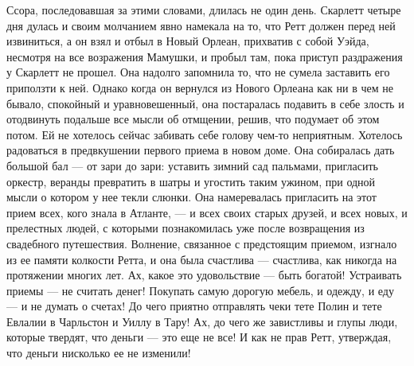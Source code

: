 Ссора, последовавшая за этими словами, длилась не один день. Скарлетт четыре дня дулась и своим молчанием явно намекала на то, что Ретт должен перед ней извиниться, а он взял и отбыл в Новый Орлеан, прихватив с собой Уэйда, несмотря на все возражения Мамушки, и пробыл там, пока приступ раздражения у Скарлетт не прошел. Она надолго запомнила то, что не сумела заставить его приползти к ней.
Однако когда он вернулся из Нового Орлеана как ни в чем не бывало, спокойный и уравновешенный, она постаралась подавить в себе злость и отодвинуть подальше все мысли об отмщении, решив, что подумает об этом потом. Ей не хотелось сейчас забивать себе голову чем-то неприятным. Хотелось радоваться в предвкушении первого приема в новом доме. Она собиралась дать большой бал — от зари до зари: уставить зимний сад пальмами, пригласить оркестр, веранды превратить в шатры и угостить таким ужином, при одной мысли о котором у нее текли слюнки. Она намеревалась пригласить на этот прием всех, кого знала в Атланте, — и всех своих старых друзей, и всех новых, и прелестных людей, с которыми познакомилась уже после возвращения из свадебного путешествия. Волнение, связанное с предстоящим приемом, изгнало из ее памяти колкости Ретта, и она была счастлива — счастлива, как никогда на протяжении многих лет.
Ах, какое это удовольствие — быть богатой! Устраивать приемы — не считать денег! Покупать самую дорогую мебель, и одежду, и еду — и не думать о счетах! До чего приятно отправлять чеки тете Полин и тете Евлалии в Чарльстон и Уиллу в Тару! Ах, до чего же завистливы и глупы люди, которые твердят, что деньги — это еще не все! И как не прав Ретт, утверждая, что деньги нисколько ее не изменили!




